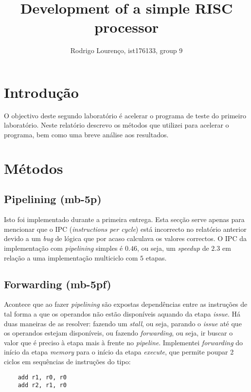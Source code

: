 \documentclass[]{IEEEtran}
\author{Rodrigo Lourenço, ist176133, group 9}
\title{Development of a simple RISC processor}
\begin{document}
\maketitle

\section{Introdução}

O objectivo deste segundo laboratório é acelerar o programa de teste do primeiro
laboratório. Neste relatório descrevo os métodos que utilizei para acelerar o
programa, bem como uma breve análise aos resultados.

\section{Métodos}

\subsection{Pipelining (mb-5p)}

Isto foi implementado durante a primeira entrega. Esta secção serve apenas para
mencionar que o IPC (\emph{instructions per cycle}) está incorrecto no relatório
anterior devido a um \emph{bug} de lógica que por acaso calculava os valores
correctos. O IPC da implementação com \emph{pipelining} simples é $0.46$, ou
seja, um \emph{speedup} de $2.3$ em relação a uma implementação multiciclo com
$5$ etapas.

\subsection{Forwarding (mb-5pf)}

Acontece que ao fazer \emph{pipelining} são expostas dependências entre as
instruções de tal forma a que os operandos não estão disponíveis aquando da
etapa \emph{issue}. Há duas maneiras de as resolver: fazendo um \emph{stall}, ou
seja, parando o \emph{issue} até que os operandos estejam disponíveis, ou
fazendo \emph{forwarding}, ou seja, ir buscar o valor que é preciso à etapa mais
à frente no \emph{pipeline}. Implementei \emph{forwarding} do início da etapa
\emph{memory} para o início da etapa \emph{execute}, que permite poupar 2 ciclos
em sequências de instruções do tipo:

\begin{verbatim}
    add r1, r0, r0
    add r2, r1, r0
\end{verbatim}
\end{document}
